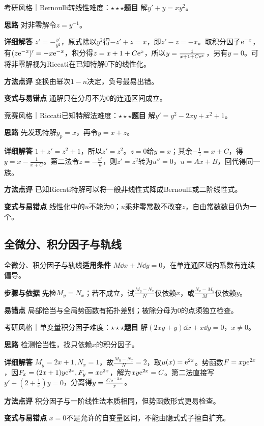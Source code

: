 \begin{example}{考研风格｜Bernoulli转线性}{难度：$\star\star\star$}\label{deep:ex:ode_source_deep:bernoulli}\textbf{题目} 解$y'+y=xy^2$。\par\textbf{思路} 对非零解令$z=y^{-1}$。\par\textbf{详细解答} $z'=-\frac{y'}{y^2}$，原式除以$y^2$得$-z'+z=x$，即$z'-z=-x$。取积分因子$\mathrm{e}^{-x}$，有$(z\mathrm{e}^{-x})'=-x\mathrm{e}^{-x}$，积分得$z=x+1+C\mathrm{e}^x$，所以$y=\frac{1}{x+1+C\mathrm{e}^x}$，另有$y=0$。可将非零解视为Riccati在已知特解0下的线性化。\par\textbf{方法点评} 变换由幂次$1-n$决定，负号最易出错。\par\textbf{变式与易错点} 通解只在分母不为0的连通区间成立。\end{example}

\begin{example}{竞赛风格｜Riccati已知特解法}{难度：$\star\star\star$}\label{deep:ex:ode_source_deep:riccati}\textbf{题目} 解$y'=y^2-2xy+x^2+1$。\par\textbf{思路} 先发现特解$y_p=x$，再令$y=x+z$。\par\textbf{详细解答} $1+z'=z^2+1$，所以$z'=z^2$。$z=0$给$y=x$；其余$-\frac{1}{z}=x+C$，得$y=x-\frac{1}{x+C}$。第二法令$z=-\frac{u'}{u}$，则$z'=z^2$转为$u''=0$，$u=Ax+B$，回代得同一族。\par\textbf{方法点评} 已知Riccati特解可以将一般非线性式降成Bernoulli或二阶线性式。\par\textbf{变式与易错点} 线性化中的$u$不能为0；$u$乘非零常数不改变$z$，自由常数数目仍为一个。\end{example}

\subsection{全微分、积分因子与轨线}\label{deep:ode_source_deep:exact}

\begin{method}{全微分、积分因子与轨线}\textbf{适用条件} $M\dd x+N\dd y=0$，在单连通区域内系数有连续偏导。\par\textbf{步骤与依据} 先检$M_y=N_x$；若不成立，试$\frac{M_y-N_x}{N}$仅依赖$x$，或$\frac{N_x-M_y}{M}$仅依赖$y$。\par\textbf{易错点} 局部恰当与全局势函数有拓扑差别；被除分母为0的点须独立检查。\end{method}

\begin{example}{考研风格｜单变量积分因子}{难度：$\star\star\star$}\label{deep:ex:ode_source_deep:factor}\textbf{题目} 解$(2xy+y)\dd x+x\dd y=0$，$x\ne0$。\par\textbf{思路} 检测恰当性，找只依赖$x$的积分因子。\par\textbf{详细解答} $M_y=2x+1,N_x=1$，故$\frac{M_y-N_x}{N}=2$，取$\mu(x)=\mathrm{e}^{2x}$。势函数$F=x y\mathrm{e}^{2x}$，因$F_x=(2x+1)y\mathrm{e}^{2x},F_y=x\mathrm{e}^{2x}$，解为$xy\mathrm{e}^{2x}=C$。第二法直接写$y'+(2+\frac{1}{x})y=0$，分离得$y=\frac{C\mathrm{e}^{-2x}}{x}$。\par\textbf{方法点评} 积分因子与一阶线性法本质相同，但势函数形式更易检查。\par\textbf{变式与易错点} $x=0$不是允许的自变量区间，不能由隐式式子擅自扩充。\end{example}

